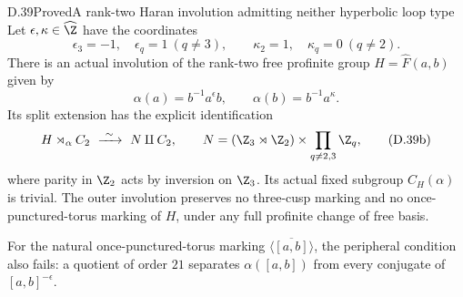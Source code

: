 \begin{claim}{D.39}{Proved}{A rank-two Haran involution admitting neither hyperbolic loop type}
Let $\epsilon,\kappa\in\widehat\Z$ have the coordinates
\[
 \epsilon_3=-1,\quad\epsilon_q=1\ (q\ne3),\qquad
 \kappa_2=1,\quad\kappa_q=0\ (q\ne2).
\]
There is an actual involution of the rank-two free
profinite group $H=\widehat F(a,b)$ given by
\[
 \alpha(a)=b^{-1}a^\epsilon b,\qquad
 \alpha(b)=b^{-1}a^\kappa.                                  \tag{D.39a}
\]
Its split extension has the explicit identification
\[
 H\rtimes_\alpha C_2\ \xrightarrow{\ \sim\ }\ N\amalg C_2,
 \qquad
 N=(\Z_3\rtimes\Z_2)\times\prod_{q\ne2,3}\Z_q,               \tag{D.39b}
\]
where parity in $\Z_2$ acts by inversion on $\Z_3$.
Its actual fixed subgroup $C_H(\alpha)$ is trivial.
The outer involution preserves no three-cusp
marking and no once-punctured-torus marking of $H$,
under any full profinite change of free basis.

For the natural once-punctured-torus marking
$\overline{\langle[a,b]\rangle}$, the peripheral
condition also fails: a quotient of order $21$
separates $\alpha([a,b])$ from every conjugate
of $[a,b]^{-\epsilon}$.
\end{claim}
